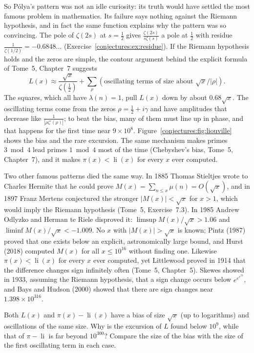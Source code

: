 So P\'olya's pattern was not an idle curiosity: its truth would have settled the most famous problem in mathematics. Its failure says nothing against the
Riemann hypothesis, and in fact the same function explains why the pattern was so convincing. The pole of $\zeta(2s)$ at $s=\frac12$ gives $\frac{\zeta(2s)}{s\zeta(s)}$ a pole at $\frac12$ with
residue $\frac1{\zeta(1/2)}=-0.6848\ldots$ (Exercise~\ref{conjectures:ex:residue}). If the Riemann hypothesis holds and the zeros are simple, the contour argument behind the
explicit formula of Tome~5, Chapter~7 suggests
\[
L(x)\approx\frac{\sqrt x}{\zeta(\frac12)}+\sum_\rho(\text{oscillating terms of size about }\sqrt x/|\rho|).
\]
The squares, which all have $\lambda(n)=1$, pull $L(x)$ down by about $0.68\sqrt x$. The oscillating terms come from the zeros $\rho=\frac12+i\gamma$ and have
amplitudes that decrease like $\frac1{|\rho\zeta'(\rho)|}$; to beat the bias, many of them must line up in phase, and that happens for the first time near
$9\times10^8$. Figure~\ref{conjectures:fig:liouville} shows the bias and the rare excursion. The same mechanism makes primes $3\bmod4$ lead primes $1\bmod4$ most of the time
(Chebyshev's bias, Tome~5, Chapter~7), and it makes $\pi(x)<\operatorname{li}(x)$ for every $x$ ever computed.

\begin{remark}
Two other famous patterns died the same way. In 1885 Thomas Stieltjes wrote to Charles Hermite that he could prove $M(x)=\sum_{n\le x}\mu(n)=O(\sqrt x)$, and
in 1897 Franz Mertens conjectured the stronger $|M(x)|<\sqrt x$ for $x>1$, which would imply the Riemann hypothesis (Tome~5, Exercise~7.3). In 1985 Andrew
Odlyzko and Herman te Riele disproved it: $\limsup M(x)/\sqrt x>1.06$ and $\liminf M(x)/\sqrt x<-1.009$. No $x$ with $|M(x)|>\sqrt x$ is known; Pintz (1987) proved
that one exists below an explicit, astronomically large bound, and Hurst (2018) computed $M(x)$ for all $x\le10^{16}$ without finding one. Likewise
$\pi(x)<\operatorname{li}(x)$ for every $x$ ever computed, yet Littlewood proved in 1914 that the difference changes sign infinitely often (Tome~5, Chapter~5).
Skewes showed in 1933, assuming the Riemann hypothesis, that a sign change occurs below $e^{e^{e^{79}}}$, and Bays and Hudson (2000) showed that there are sign
changes near $1.398\times10^{316}$.
\end{remark}

\begin{think}
Both $L(x)$ and $\pi(x)-\operatorname{li}(x)$ have a bias of size $\sqrt x$ (up to logarithms) and oscillations of the same size. Why is the excursion of $L$
found below $10^9$, while that of $\pi-\operatorname{li}$ is far beyond $10^{300}$? Compare the size of the bias with the size of the first oscillating term in each
case.
\end{think}

